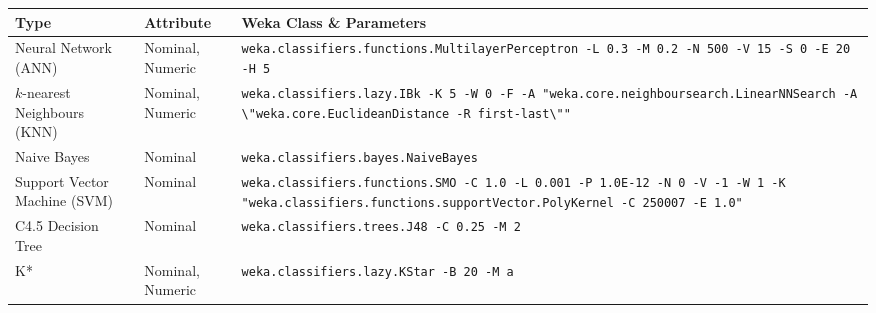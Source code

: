 \documentclass[../thesis/thesis.tex]{subfiles}
\begin{document}
\begin{table}
\centering
\begin{tabular}{|p{40mm}|p{20mm}|p{70mm}|}
\hline
\textbf{Type} & \textbf{Attribute} & \textbf{Weka Class} \& \textbf{Parameters} \\ \hline

{Neural Network \newline (ANN)} & {Nominal, \newline Numeric} & \texttt{weka.classifiers.functions\newline.MultilayerPerceptron \newline -L 0.3 -M 0.2 -N 500 -V 15 \newline -S 0 -E 20 -H 5} \\ \hline

{$k$-nearest Neighbours \newline (KNN)} & Nominal, \newline Numeric & \texttt{weka.classifiers.lazy.IBk \newline -K 5 -W 0 -F \newline -A "weka.core.neighboursearch\newline.LinearNNSearch -A \textbackslash"weka.core\newline.EuclideanDistance \newline -R first-last\textbackslash""} \\ \hline

Naive Bayes & Nominal & \texttt{weka.classifiers.bayes.NaiveBayes} \\ \hline

{Support Vector \newline Machine (SVM)} & Nominal & \texttt{weka.classifiers.functions.SMO \newline -C 1.0 -L 0.001 -P 1.0E-12 \newline -N 0 -V -1 -W 1 \newline -K "weka.classifiers.functions\newline.supportVector.PolyKernel \newline-C 250007 -E 1.0"} \\ \hline

{C4.5 \newline Decision Tree} & Nominal & \texttt{weka.classifiers.trees.J48 \newline -C 0.25 -M 2} \\ \hline

K* & Nominal, \newline Numeric & \texttt{weka.classifiers.lazy.KStar \newline -B 20 -M a} \\ \hline


\end{tabular}
\end{table}
\end{document}
